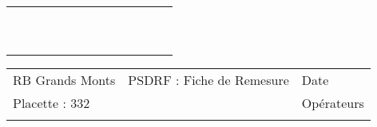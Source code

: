 \documentclass[a4paper, landscape]{article}\usepackage[]{graphicx}\usepackage[]{color}
\begin{document}
{\begin{tabular}{|p{1cm}|p{2cm}|p{1.6cm}|p{1.6cm}|p{1.6cm}|p{1.6cm}|p{1.5cm}|p{1.5cm}|p{1.5cm}|p{1.5cm}|p{1.5cm}|p{7.5cm}|p{5cm}|}
 &  &  &  &  &  &  &  &  &  &  &  &  \\ 
   \hline
 &  &  &  &  &  &  &  &  &  &  &  &  \\ 
   \rowcolor[gray]{0.95} \hline
 &  &  &  &  &  &  &  &  &  &  &  &  \\ 
   \hline
 &  &  &  &  &  &  &  &  &  &  &  &  \\ 
   \rowcolor[gray]{0.95} \hline
 &  &  &  &  &  &  &  &  &  &  &  &  \\ 
   \hline
 &  &  &  &  &  &  &  &  &  &  &  &  \\ 
   \rowcolor[gray]{0.95} \hline
 &  &  &  &  &  &  &  &  &  &  &  &  \\ 
   \hline
 &  &  &  &  &  &  &  &  &  &  &  &  \\ 
   \rowcolor[gray]{0.95} \hline
 &  &  &  &  &  &  &  &  &  &  &  &  \\ 
   \hline
 &  &  &  &  &  &  &  &  &  &  &  &  \\ 
   \rowcolor[gray]{0.95} \hline
 &  &  &  &  &  &  &  &  &  &  &  &  \\ 
   \hline
\end{tabular}
}

\begin{tabular}{p{10cm}p{10cm}p{8cm}}
  RB Grands Monts & PSDRF : Fiche de Remesure & Date \\ 
  Placette : 332 &  & Opérateurs \\ 
   &  &  \\ 
  \end{tabular}
\end{document}
